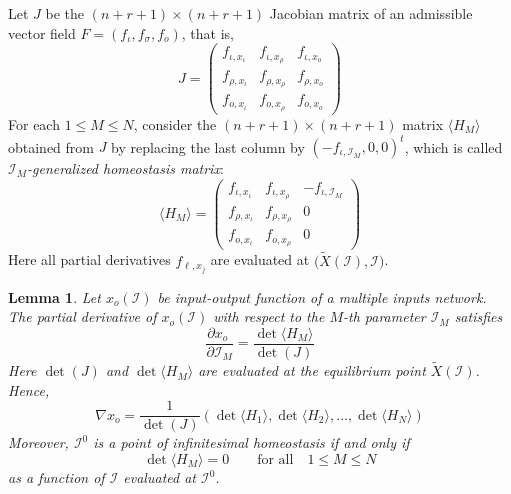 \documentclass[pdflatex,sn-basic,Numbered]{sn-jnl}
\theoremstyle{thmstyleone}%
\newtheorem{lemma}[theorem]{Lemma}
\numberwithin{equation}{section}
\begin{document}
Let $J$ be the $(n+r+1)\times (n+r+1)$ Jacobian matrix of an admissible vector field $F=(f_{\iota},f_{\sigma},f_{o})$, that is,
\begin{equation} \label{jacobian2}
J = \begin{pmatrix}
  f_{\iota, x_\iota}   &  f_{\iota, x_\rho} & f_{\iota, x_o} \\
  f_{\rho, x_\iota}   &  f_{\rho, x_\rho} & f_{\rho, x_o} \\
  f_{o, x_\iota} &  f_{o, x_\rho} & f_{o, x_o} 
\end{pmatrix}
\end{equation}
For each $1 \leq M \leq N$, consider the $(n+r+1)\times (n+r+1)$ matrix $\langle H_M \rangle$ obtained from $J$ by replacing the last column by $(-f_{\iota,\mathcal{I}_M},0,0)^t$, which is called \emph{$\mathcal{I}_M$-generalized homeostasis matrix}:
\begin{equation} \label{weighted_homeostasis_matrix_definition_mi}
\langle H_M \rangle = 
\begin{pmatrix}
f_{\iota, x_\iota} &  f_{\iota, x_\rho} & -f_{\iota, \mathcal{I}_M} \\
f_{\rho, x_\iota}&  f_{\rho, x_\rho} & 0 \\
f_{o, x_\iota} &  f_{o, x_\rho} & 0
\end{pmatrix}
\end{equation}
Here all partial derivatives $f_{\ell,x_j}$ are evaluated at $\big(\tilde{X}(\mathcal{I}),\mathcal{I}\big)$.

\begin{lemma} \label{cramer_rule2}
Let $x_o(\mathcal{I})$ be input-output function of a multiple inputs network.
The partial derivative of $x_o(\mathcal{I})$ with respect to the $M$-th parameter $\mathcal{I}_M$ satisfies
\begin{equation} \label{xo'}
\frac{\partial x_o\;}{\partial \mathcal{I}_M} = \frac{\det\langle H_M \rangle}{\det(J)}
\end{equation}
Here $\det(J)$ and $\det\langle H_M \rangle$ are evaluated at the equilibrium point $\tilde{X}(\mathcal{I})$. Hence, 
\begin{equation} \label{gradient_simplified}
    \nabla x_{o} = \frac{1}{\det (J)}\left(\det \langle H_{1} \rangle, \det \langle H_{2} \rangle, \ldots, \det \langle H_{N} \rangle \right)
\end{equation}
Moreover, $\mathcal{I}^0$ is a point of infinitesimal homeostasis if and only if
\begin{equation} \label{xo'_reduced3}
\det\langle H_M \rangle = 0
\qquad \text{for all} \quad 1 \leq M \leq N
\end{equation}
as a function of $\mathcal{I}$ evaluated at $\mathcal{I}^0$.
\end{lemma}
\end{document}
